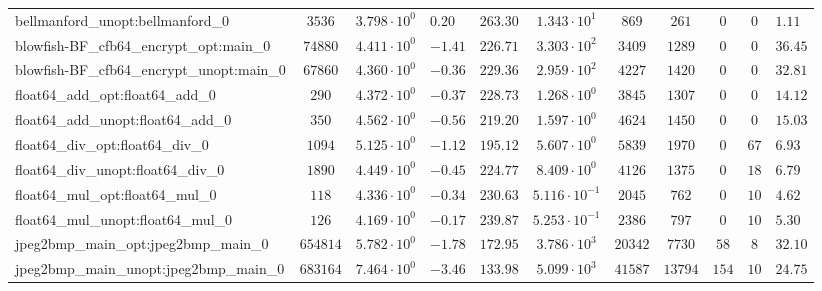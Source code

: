 \begin{tabular}{|l|c|HHc|c|c|c|c|cH|}
bellmanford\_unopt:bellmanford\_0               & $ 3536     $ & $ 3.798 \cdot 10^{0} $ & $ 0.20  $ & $ 263.30 $ & $ 1.343 \cdot 10^{1}  $ & $ 869    $ & $ 261   $ & $ 0   $ & $ 0   $ & $ 1.11    $ \\
blowfish-BF\_cfb64\_encrypt\_opt:main\_0        & $ 74880    $ & $ 4.411 \cdot 10^{0} $ & $ -1.41 $ & $ 226.71 $ & $ 3.303 \cdot 10^{2}  $ & $ 3409   $ & $ 1289  $ & $ 0   $ & $ 0   $ & $ 36.45   $ \\
blowfish-BF\_cfb64\_encrypt\_unopt:main\_0      & $ 67860    $ & $ 4.360 \cdot 10^{0} $ & $ -0.36 $ & $ 229.36 $ & $ 2.959 \cdot 10^{2}  $ & $ 4227   $ & $ 1420  $ & $ 0   $ & $ 0   $ & $ 32.81   $ \\
float64\_add\_opt:float64\_add\_0               & $ 290      $ & $ 4.372 \cdot 10^{0} $ & $ -0.37 $ & $ 228.73 $ & $ 1.268 \cdot 10^{0}  $ & $ 3845   $ & $ 1307  $ & $ 0   $ & $ 0   $ & $ 14.12   $ \\
float64\_add\_unopt:float64\_add\_0             & $ 350      $ & $ 4.562 \cdot 10^{0} $ & $ -0.56 $ & $ 219.20 $ & $ 1.597 \cdot 10^{0}  $ & $ 4624   $ & $ 1450  $ & $ 0   $ & $ 0   $ & $ 15.03   $ \\
float64\_div\_opt:float64\_div\_0               & $ 1094     $ & $ 5.125 \cdot 10^{0} $ & $ -1.12 $ & $ 195.12 $ & $ 5.607 \cdot 10^{0}  $ & $ 5839   $ & $ 1970  $ & $ 0   $ & $ 67  $ & $ 6.93    $ \\
float64\_div\_unopt:float64\_div\_0             & $ 1890     $ & $ 4.449 \cdot 10^{0} $ & $ -0.45 $ & $ 224.77 $ & $ 8.409 \cdot 10^{0}  $ & $ 4126   $ & $ 1375  $ & $ 0   $ & $ 18  $ & $ 6.79    $ \\
float64\_mul\_opt:float64\_mul\_0               & $ 118      $ & $ 4.336 \cdot 10^{0} $ & $ -0.34 $ & $ 230.63 $ & $ 5.116 \cdot 10^{-1} $ & $ 2045   $ & $ 762   $ & $ 0   $ & $ 10  $ & $ 4.62    $ \\
float64\_mul\_unopt:float64\_mul\_0             & $ 126      $ & $ 4.169 \cdot 10^{0} $ & $ -0.17 $ & $ 239.87 $ & $ 5.253 \cdot 10^{-1} $ & $ 2386   $ & $ 797   $ & $ 0   $ & $ 10  $ & $ 5.30    $ \\
jpeg2bmp\_main\_opt:jpeg2bmp\_main\_0           & $ 654814   $ & $ 5.782 \cdot 10^{0} $ & $ -1.78 $ & $ 172.95 $ & $ 3.786 \cdot 10^{3}  $ & $ 20342  $ & $ 7730  $ & $ 58  $ & $ 8   $ & $ 32.10   $ \\
jpeg2bmp\_main\_unopt:jpeg2bmp\_main\_0         & $ 683164   $ & $ 7.464 \cdot 10^{0} $ & $ -3.46 $ & $ 133.98 $ & $ 5.099 \cdot 10^{3}  $ & $ 41587  $ & $ 13794 $ & $ 154 $ & $ 10  $ & $ 24.75   $ \\

\end{tabular}
